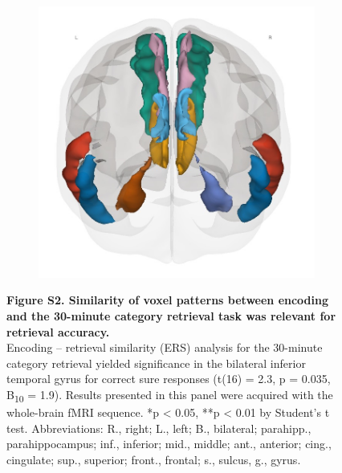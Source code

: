 \begin{figure}[!ht]
\begin{subfigure}[]{0.19\linewidth}
\end{subfigure}
\begin{subfigure}[]{0.19\linewidth}
    \centering
    \includegraphics[width=\linewidth]{paper/src/figures/wb_rois_back.jpg}
\end{subfigure}
     \caption*{\textbf{Figure S2. Similarity of voxel patterns between encoding and the 30-minute category retrieval task was relevant for retrieval accuracy.} \\ \vspace{0.5em}
Encoding – retrieval similarity (ERS) analysis for the 30-minute category retrieval yielded significance in the bilateral inferior temporal gyrus for correct sure responses (t(16) = 2.3, p = 0.035, B\textsubscript{10} = 1.9).  Results presented in this panel were acquired with the whole-brain fMRI sequence. *p < 0.05, **p < 0.01 by Student’s t test. Abbreviations: R., right; L., left; B., bilateral; parahipp., parahippocampus; inf., inferior; mid., middle; ant., anterior; cing., cingulate; sup., superior; front., frontal; s., sulcus, g., gyrus.
}
\end{figure}

\newpage


